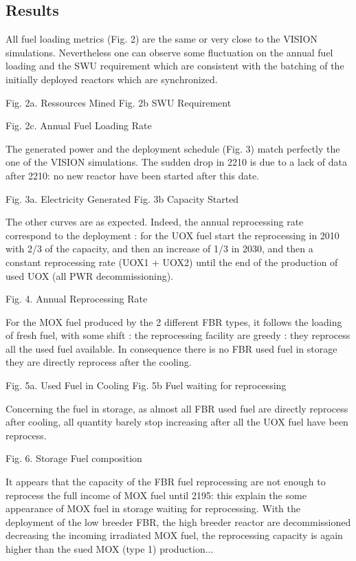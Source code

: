 \documentclass[12pt]{article}
\begin{document}
\subsection{Results}
All fuel loading metrics (Fig. 2) are the same or very close to the VISION simulations. Nevertheless one can observe some fluctuation on the annual fuel loading and the SWU requirement which are consistent with the batching of the initially deployed reactors which are synchronized.  


Fig. 2a. Ressources Mined				Fig. 2b SWU Requirement		 

Fig. 2c. Annual Fuel Loading Rate


The generated power and the deployment schedule (Fig. 3)  match perfectly the one of the VISION simulations. The sudden drop in 2210 is due to a lack of data after 2210: no new reactor have been started after this date.

Fig. 3a. Electricity Generated				Fig. 3b Capacity Started		

The other curves are as expected. Indeed, the annual reprocessing rate correspond to the deployment :  for the UOX fuel start the reprocessing in 2010 with 2/3 of the capacity, and then an increase of 1/3 in 2030, and then a constant reprocessing rate (UOX1 + UOX2) until the end of the production of used UOX (all PWR decommissioning).


 
Fig. 4. Annual Reprocessing Rate


 For the MOX fuel produced by the 2 different FBR types, it follows the loading of fresh fuel, with some shift : the reprocessing facility are greedy : they reprocess all the used fuel available. In consequence there is no FBR used fuel in storage they are directly reprocess after the cooling.




Fig. 5a. Used Fuel in Cooling			Fig. 5b Fuel waiting for reprocessing



Concerning the fuel in storage, as almost all FBR used fuel are directly reprocess after cooling, all quantity barely stop increasing after all the UOX fuel have been reprocess. 

Fig. 6. Storage Fuel composition

It appears that the capacity of the FBR fuel reprocessing are not enough to reprocess the full income of MOX fuel until 2195: this explain the some appearance of MOX fuel in storage waiting for reprocessing. With the deployment of the low breeder FBR, the high breeder reactor are decommissioned decreasing the incoming irradiated MOX fuel,  the reprocessing capacity is again higher than the sued MOX (type 1) production...
\end{document}
